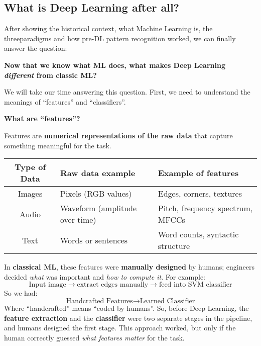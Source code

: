 \subsection{What is Deep Learning after all?}

After showing the historical context, what Machine Learning is, the three\break paradigms and how pre-DL pattern recognition worked, we can finally answer the question:
\begin{center}
    \textbf{Now that we know what ML does, what makes Deep Learning \emph{different} from classic ML?}
\end{center}

\noindent
We will take our time answering this question. First, we need to understand the meanings of ``features'' and ``classifiers''.

\highspace
\begin{flushleft}
    \textcolor{Green3}{ \textbf{What are ``features''?}}
\end{flushleft}
Features are \textbf{numerical representations of the raw data} that capture something meaningful for the task.

\begin{table}[!htp]
    \centering
    \begin{tabular}{@{} c p{11.5em} p{10.4em} @{}}
        \toprule
        Type of Data & Raw data example & Example of features \\
        \midrule
        Images  & Pixels (RGB values)               & Edges, corners, textures         \\[.3em]
        Audio   & Waveform (amplitude over time)    & Pitch, frequency spectrum, MFCCs \\[.3em]
        Text    & Words or sentences                & Word counts, syntactic structure \\
        \bottomrule
    \end{tabular}
\end{table}

\noindent
In \textbf{classical ML}, these features were \textbf{manually designed} by humans; engineers decided \emph{what} was important and \emph{how to compute it}. For example:
\begin{equation*}
    \text{Input image} \rightarrow \text{extract edges manually} \rightarrow \text{feed into SVM classifier}
\end{equation*}
So we had:
\begin{equation*}
    \text{Handcrafted Features} \rightarrow \text{Learned Classifier}
\end{equation*}
Where ``handcrafted'' means ``coded by humans''. So, before Deep Learning, the \textbf{feature extraction} and the \textbf{classifier} were two separate stages in the pipeline, and humans designed the first stage. This approach worked, but only if the human correctly guessed \emph{what features matter} for the task.

